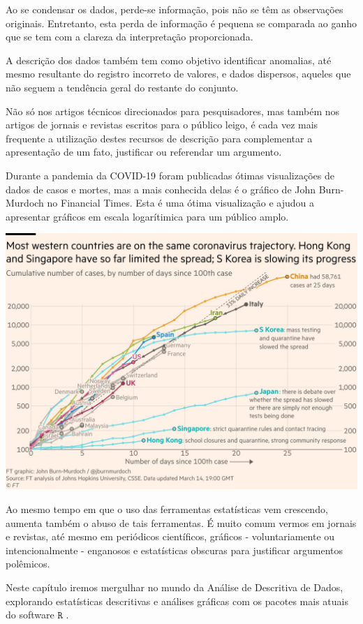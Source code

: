 \documentclass[
]{book}
\begin{document}
Ao se condensar os dados, perde-se informação, pois não se têm as observações originais. Entretanto, esta perda de informação é pequena se comparada ao ganho que se tem com a clareza da interpretação proporcionada.

A descrição dos dados também tem como objetivo identificar anomalias, até mesmo resultante do registro incorreto de valores, e dados dispersos, aqueles que não seguem a tendência geral do restante do conjunto.

Não só nos artigos técnicos direcionados para pesquisadores, mas também nos artigos de jornais e revistas escritos para o público leigo, é cada vez mais frequente a utilização destes recursos de descrição para complementar a apresentação de um fato, justificar ou referendar um argumento.

Durante a pandemia da COVID-19 foram publicadas ótimas visualizações de dados de casos e mortes, mas a mais conhecida delas é o gráfico de John Burn-Murdoch no Financial Times. Esta é uma ótima visualização e ajudou a apresentar gráficos em escala logarítimica para um público amplo.

\includegraphics{financial_times.jpg}

Ao mesmo tempo em que o uso das ferramentas estatísticas vem crescendo, aumenta também o abuso de tais ferramentas. É muito comum vermos em jornais e revistas, até mesmo em periódicos científicos, gráficos - voluntariamente ou intencionalmente - enganosos e estatísticas obscuras para justificar argumentos polêmicos.

Neste capítulo iremos mergulhar no mundo da Análise de Descritiva de Dados, explorando estatísticas descritivas e análises gráficas com os pacotes mais atuais do software \(\texttt{R}\) \citep{R2020}.
\end{document}
